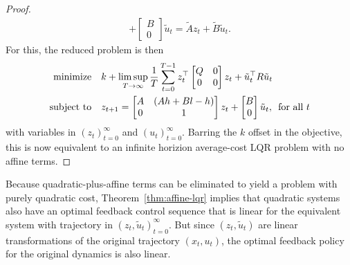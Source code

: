 \documentclass[12pt]{article}
\begin{document}
\begin{proof}
\begin{align*}
        + \begin{bmatrix} B \\ 0 \end{bmatrix}
          \tilde{u}_t
      = \tilde{A} z_t + \tilde{B} \tilde{u}_t.
  \end{align*}
  For this, the reduced problem is then
  \begin{align*}
    \text{minimize}
      &\quad k + \limsup_{T \to \infty} \frac{1}{T} \sum_{t = 0}^{T - 1}
        z_t ^\top \begin{bmatrix} Q & 0 \\ 0 & 0 \end{bmatrix} z_t
        + \tilde{u}_t ^\top R \tilde{u}_t \\
    \text{subject to}
      &\quad z_{t + 1}
        = \begin{bmatrix} A & (Ah + Bl - h) \\ 0 & 1 \end{bmatrix}
          z_t
          + \begin{bmatrix} B \\ 0 \end{bmatrix}
          \tilde{u}_t, \enskip \text{for all \(t\)}
  \end{align*}
  with variables in \((z_t)_{t = 0}^{\infty}\)
  and \((u_t)_{t = 0}^{\infty}\).
  Barring the \(k\) offset in the objective,
  this is now equivalent to an infinite horizion average-cost
  LQR problem with no affine terms.
\end{proof}

Because quadratic-plus-affine terms can be eliminated to yield
a problem with purely quadratic cost,
Theorem~\ref{thm:affine-lqr} implies that
quadratic systems also have an optimal feedback control sequence
that is linear for the equivalent system with
trajectory in \((z_t, \tilde{u}_t)_{t = 0}^{\infty}\).
But since \((z_t, \tilde{u}_t)\) are linear transformations of
the original trajectory \((x_t, u_t)\),
the optimal feedback policy for the original dynamics is also linear.
\end{document}
